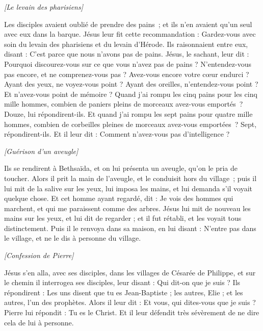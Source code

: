 \begin{multicols}{2}
\begin{center}
\textit{[Le levain des pharisiens]}
\end{center}
\PPE{}
Les disciples avaient oublié de prendre des pains ; et ils n'en avaient qu'un seul avec eux dans la barque.
Jésus leur fit cette recommandation : Gardez-vous avec soin du levain des pharisiens et du levain d'Hérode.
Ils raisonnaient entre eux, disant : C'est parce que nous n'avons pas de pains.
Jésus, le sachant, leur dit : Pourquoi discourez-vous sur ce que vous n'avez pas de pains ? N’entendez-vous pas encore, et ne comprenez-vous pas ?
Avez-vous encore votre cœur endurci ? Ayant des yeux, ne voyez-vous point ? Ayant des oreilles, n'entendez-vous point ? Et n'avez-vous point de mémoire ?
Quand j’ai rompu les cinq pains pour les cinq mille hommes, combien de paniers pleins de morceaux avez-vous emportés ? Douze, lui répondirent-ils.
Et quand j’ai rompu les sept pains pour quatre mille hommes, combien de corbeilles pleines de morceaux avez-vous emportées ? Sept, répondirent-ils.
Et il leur dit : Comment n'avez-vous pas d'intelligence ?
\begin{center}
\textit{[Guérison d'un aveugle]}
\end{center}
\PPE{}
Ils se rendirent à Bethsaïda, et on lui présenta un aveugle, qu’on le pria de toucher.
Alors il prit la main de l'aveugle, et le conduisit hors du village ; puis il lui mit de la salive sur les yeux, lui imposa les mains, et lui demanda s'il voyait quelque chose.
Et cet homme ayant regardé, dit : Je vois des hommes qui marchent, et qui me paraissent comme des arbres.
Jésus lui mit de nouveau les mains sur les yeux, et lui dit de regarder ; et il fut rétabli, et les voyait tous distinctement.
Puis il le renvoya dans sa maison, en lui disant : N'entre pas dans le village, et ne le dis à personne du village.
\begin{center}
\textit{[Confession de Pierre]}
\end{center}
\PPE{}
Jésus s’en alla, avec ses disciples, dans les villages de Césarée de Philippe, et sur le chemin il interrogea ses disciples, leur disant : Qui dit-on que je suis ?
Ils répondirent : Les uns disent que tu es Jean-Baptiste ; les autres, Elie ; et les autres, l'un des prophètes.
Alors il leur dit : Et vous, qui dites-vous que je suis ? Pierre lui répondit : Tu es le Christ.
Et il leur défendit très sévèrement de ne dire cela de lui à personne.
\begin{center}

\end{center}
\end{multicols}
